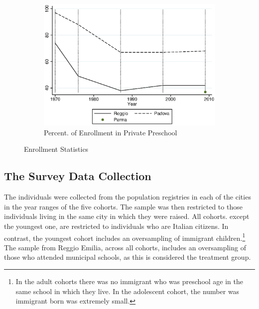 \begin{figure}[H]
\begin{subfigure}[ht]{0.48\textwidth}
        \includegraphics[width=\textwidth]{../../output/image/enroll_per_priv_graph.eps}
        \caption{Percent. of Enrollment in Private Preschool}
        \label{fig:large}
      \end{subfigure}
      \caption{Enrollment Statistics}
    \end{figure}


\subsection{The Survey Data Collection}

The individuals were collected from the population registries in each of the cities in the year ranges of the five cohorts. The sample was then restricted to those individuals living in the same city in which they were raised. All cohorts. except the youngest one, are restricted to individuals who are Italian citizens. In contrast, the youngest cohort includes an oversampling of immigrant children.\footnote{In the adult cohorts there was no immigrant who was preschool age in the same school in which they live. In the adolescent cohort, the number was immigrant born was extremely small.} The sample from Reggio Emilia, across all cohorts, includes an oversampling of those who attended municipal schools, as this is considered the treatment group.

